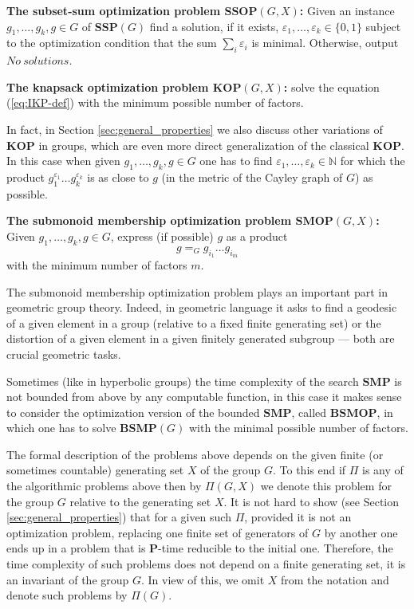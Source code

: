 \documentclass[10pt]{amsart}
\theoremstyle{definition}
\def\P{{\mathbf{P}}}
\def\SSP{{\mathbf{SSP}}}
\def\SMP{{\mathbf{SMP}}}
\def\BSMP{{\mathbf{BSMP}}}
\def\KOP{{\mathbf{KOP}}}
\def\SSOP{{\mathbf{SSOP}}}
\def\SMOP{{\mathbf{SMOP}}}
\def\BSMOP{{\mathbf{BSMOP}}}
\begin{document}
\medskip
\noindent
{\bf The subset-sum optimization problem $\SSOP(G,X)$\index{$\SSOP(G,X)$}:}  Given an instance $g_1,\ldots,g_k,g\in G$ of  $\SSP(G)$ find a solution, if it exists,
$\varepsilon_1,\ldots,\varepsilon_k \in \{0,1\}$  subject to the optimization  condition that
the sum $\sum_i \varepsilon_i$ is minimal. Otherwise, output $No \ solutions$.

\medskip
\noindent
{\bf The knapsack optimization problem  $\KOP(G,X)$\index{$\KOP(G,X)$}:} solve the equation (\ref{eq:IKP-def}) 
with the minimum possible number of factors.

\medskip
In fact, in Section \ref{sec:general_properties} we also discuss other variations of $\KOP$ in groups,  which are even more direct generalization of the classical $\KOP$. In this case  when given $g_1,\ldots,g_k,g\in G$ one has to find $\varepsilon_1,\ldots,\varepsilon_k \in \mathbb{N}$ for which  the product $g_1^{\varepsilon_1}\ldots g_k^{\varepsilon_k}$ is as close to $g$ (in the metric of the Cayley graph of $G$) as possible.


\medskip
\noindent
{\bf The submonoid membership optimization problem $\SMOP(G,X)$\index{$\SMOP(G,X)$}:} %
Given $g_1,\ldots,g_k,g\in G$, %
express (if possible) $g$ as a product
\begin{equation}\label{eq:MSP_G}
g =_G g_{i_1} \ldots g_{i_m}
\end{equation}
with the  minimum number of factors $m$.

\medskip
The submonoid membership optimization problem plays an important part in geometric group theory.  Indeed, in geometric language it asks to find a geodesic of a given element in a group (relative to a fixed finite generating set) or the distortion of a given element in a given finitely generated subgroup --- both are crucial geometric tasks.

Sometimes (like in hyperbolic groups) the time complexity of the search $\SMP$ is not bounded from above by any computable function, in this case it makes sense to consider the optimization  version of the bounded $\SMP$, called $\BSMOP$, in which one has to solve $\BSMP(G)$ with the minimal possible number of factors.

The formal description  of the problems above depends on the given finite (or sometimes countable) generating set $X$ of the group $G$.
To this end if $\Pi$ is any of the algorithmic problems above then by $\Pi(G,X)$ we denote this problem for the group $G$ relative to the generating set $X$.  It
is not hard to show (see Section \ref{sec:general_properties}) that for a given such $\Pi$, provided it is not an optimization problem, replacing one  finite
set of generators of $G$ by another  one ends up in a problem that is $\P$-time reducible
to the initial one.
Therefore, the time complexity of such  problems does not depend on a finite generating set,
it is an invariant of the group $G$.
In view of this, we omit $X$ from the notation   and denote such problems  by $\Pi(G)$.
\end{document}
